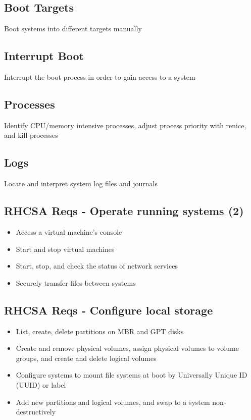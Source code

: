 \documentclass[letterpaper,10pt,english]{sphinxmanual}
\begin{document}
\subsection{Boot Targets}
\label{rhcsa:boot-targets}
Boot systems into different targets manually


\subsection{Interrupt Boot}
\label{rhcsa:interrupt-boot}
Interrupt the boot process in order to gain access to a system


\subsection{Processes}
\label{rhcsa:processes}
Identify CPU/memory intensive processes, adjust process priority with renice, and kill processes


\subsection{Logs}
\label{rhcsa:logs}
Locate and interpret system log files and journals


\subsection{RHCSA Reqs - Operate running systems (2)}
\label{rhcsa:rhcsa-reqs-operate-running-systems-2}\begin{itemize}
\item {} 
Access a virtual machine's console

\item {} 
Start and stop virtual machines

\item {} 
Start, stop, and check the status of network services

\item {} 
Securely transfer files between systems

\end{itemize}


\subsection{RHCSA Reqs - Configure local storage}
\label{rhcsa:rhcsa-reqs-configure-local-storage}\begin{itemize}
\item {} 
List, create, delete partitions on MBR and GPT disks

\item {} 
Create and remove physical volumes, assign physical volumes to volume groups, and create and delete logical volumes

\item {} 
Configure systems to mount file systems at boot by Universally Unique ID (UUID) or label

\item {} 
Add new partitions and logical volumes, and swap to a system non-destructively

\end{itemize}
\end{document}
